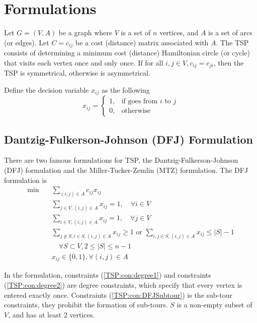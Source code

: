 			\section{Formulations}
				Let $G = (V, A)$ be a graph where $V$ is a set of $n$ vertices, and $A$ is a set of arcs (or edges). Let $C = c_{ij}$ be a cost (distance) matrix associated with $A$. The TSP consists of determining a minimum cost (distance) Hamiltonian circle (or cycle) that visits each vertex once and only once. If for all $i, j \in V, c_{ij} = c_{ji}$, then the TSP is symmetrical, otherwise is asymmetrical.

				Define the decision variable $x_{ij}$ as the following
				\begin{equation}
					x_{ij} = \begin{cases}1, &\text{if goes from } i \text{ to } j\\ 0, & \text{otherwise}\end{cases}
				\end{equation}

				\subsection{Dantzig-Fulkerson-Johnson (DFJ) Formulation}
					There are two famous formulations for TSP, the Dantzig-Fulkerson-Johnson (DFJ) formulation and the Miller-Tucker-Zemlin (MTZ) formulation. The DFJ formulation is
					\begin{align}
						\min \quad &\sum_{(i, j)\in A} c_{ij}x_{ij} \\
						& \sum_{j \in V, (i,j)\in A} x_{ij} = 1, \quad \forall i \in V \label{TSP:con:degree1}\\
						& \sum_{i \in V, (i,j)\in A} x_{ij} = 1, \quad \forall j \in V \label{TSP:con:degree2}\\
						& \sum_{j\notin S, i\in S, (i,j)\in A} x_{ij} \ge 1 \text{ or } \sum_{i, j \in S, (i, j) \in A} x_{ij} \le |S| - 1 \nonumber \\
						& \quad \forall S \subset V, 2\le |S| \le n-1 \label{TSP:con:DFJSubtour}\\
						& x_{ij} \in \{0, 1\}, \forall (i, j) \in A 
					\end{align}

					In the formulation, constraints (\ref{TSP:con:degree1}) and constraints (\ref{TSP:con:degree2}) are degree constraints, which specify that every vertex is entered exactly once. Constraints (\ref{TSP:con:DFJSubtour}) is the sub-tour constraints, they prohibit the formation of sub-tours. $S$ is a non-empty subset of $V$, and has at least 2 vertices. 

